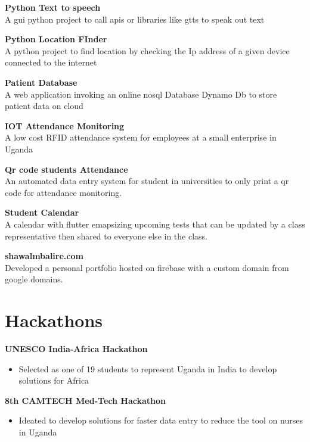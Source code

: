 \documentclass[a4paper]{article}
\begin{document}
\begin{minipage}[t]{0.5\textwidth}
        {\bf Python Text to speech}\\
        A gui python project to call apis or libraries like gtts to speak out text

        {\bf Python Location FInder}\\
        A python project to find location by checking the Ip address of a given device connected to the internet

        {\bf Patient Database}\\
        A web application invoking an online nosql Database Dynamo Db to store patient data on cloud

        {\bf IOT Attendance Monitoring}\\
        A low cost RFID attendance system for employees at a small enterprise in Uganda

        {\bf Qr code students Attendance}\\
        An automated data entry system for student in universities to only print a qr code for attendance monitoring.

        {\bf Student Calendar}\\
        A calendar with flutter emapsizing upcoming tests that can be updated by a class representative then shared to everyone else in the class.

        {\bf shawalmbalire.com}\\
        Developed a personal portfolio hosted on firebase with a custom domain from google domains.

        \section*{\bf Hackathons}

        {\bf UNESCO India-Africa Hackathon}
        \begin{itemize}[noitemsep]
            \item Selected as one of 19 students to represent Uganda in India to develop solutions for Africa
        \end{itemize}

        {\bf 8th CAMTECH Med-Tech Hackathon}
        \begin{itemize}
            \itemsep0em
            \item Ideated to develop solutions for faster data entry to reduce the tool on nurses in Uganda
        \end{itemize}


\end{minipage}
\end{document}
